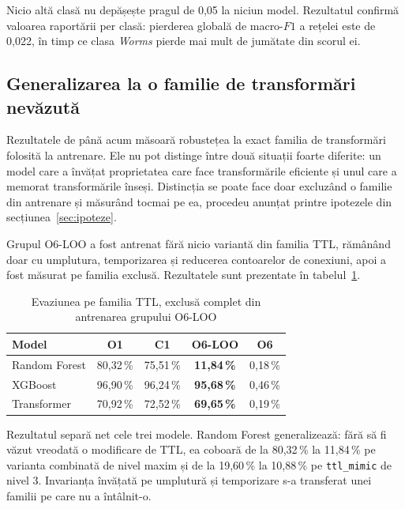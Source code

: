 Nicio altă clasă nu depășește pragul de 0,05 la niciun model. Rezultatul confirmă valoarea raportării per clasă: pierderea globală de macro-$F1$ a rețelei este de 0,022, în timp ce clasa \textit{Worms} pierde mai mult de jumătate din scorul ei.

\subsection{Generalizarea la o familie de transformări nevăzută}\label{subsec:o6-generalizare}

Rezultatele de până acum măsoară robustețea la exact familia de transformări folosită la antrenare. Ele nu pot distinge între două situații foarte diferite: un model care a învățat proprietatea care face transformările eficiente și unul care a memorat transformările înseși. Distincția se poate face doar excluzând o familie din antrenare și măsurând tocmai pe ea, procedeu anunțat printre ipotezele din secțiunea~\ref{sec:ipoteze}.

Grupul O6-LOO a fost antrenat fără nicio variantă din familia TTL, rămânând doar cu umplutura, temporizarea și reducerea contoarelor de conexiuni, apoi a fost măsurat pe familia exclusă. Rezultatele sunt prezentate în tabelul~\ref{tab:o6-loo}.

\begin{table}[!ht]
    \caption{Evaziunea pe familia TTL, exclusă complet din antrenarea grupului O6-LOO}
    \centering
    \begin{tabular}{|l|c|c|c|c|}
        \hline
        \textbf{Model} & \textbf{O1} & \textbf{C1} & \textbf{O6-LOO} & \textbf{O6} \\
        \hline
        Random Forest       & 80,32\,\% & 75,51\,\% & \textbf{11,84\,\%} & 0,18\,\% \\
        \hline
        XGBoost & 96,90\,\% & 96,24\,\% & \textbf{95,68\,\%} & 0,46\,\% \\
        \hline
        Transformer       & 70,92\,\% & 72,52\,\% & \textbf{69,65\,\%} & 0,19\,\% \\
        \hline
    \end{tabular}
    \label{tab:o6-loo}
\end{table}

Rezultatul separă net cele trei modele. Random Forest generalizează: fără să fi văzut vreodată o modificare de TTL, ea coboară de la 80,32\,\% la 11,84\,\% pe varianta combinată de nivel maxim și de la 19,60\,\% la 10,88\,\% pe \verb|ttl_mimic| de nivel 3. Invarianța învățată pe umplutură și temporizare s-a transferat unei familii pe care nu a întâlnit-o.

